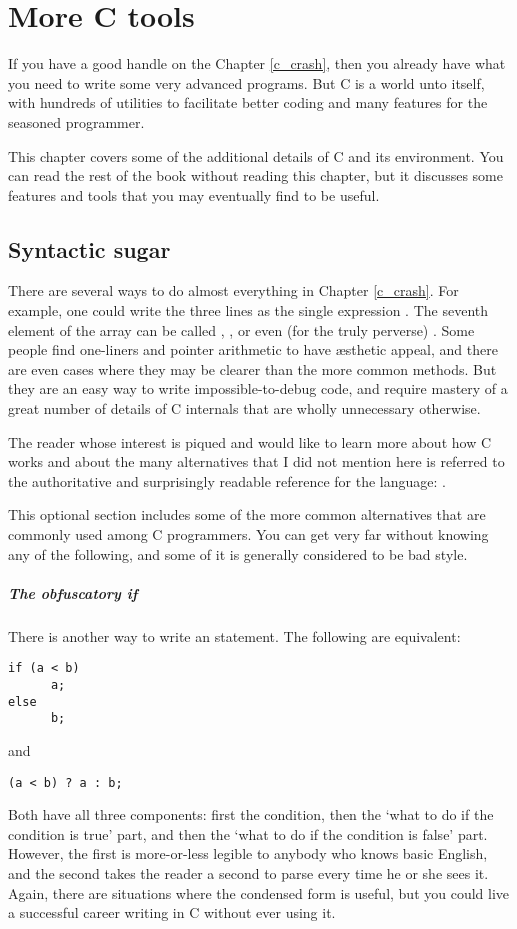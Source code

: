 \chapter{\treesymbol More C tools}

If you have a good handle on the Chapter \ref{c_crash}, then you already
have what you need to write some very advanced programs. But C is a
world unto itself, with hundreds of utilities to facilitate better
coding and many features for the seasoned programmer.

This chapter covers some of the additional details of C and its
environment. You can read the rest of the book without reading this
chapter, but it discusses some features and tools that you may
eventually find to be useful.


\section{Syntactic sugar}   
There are several ways to do almost everything in Chapter \ref{c_crash}.  For
example, one could write the three lines  as the single expression . The seventh
element of the array  can be called ,
, or even (for the truly perverse) .  Some people find one-liners and pointer arithmetic
to have \ae{}sthetic appeal, and there are even cases where they may
be clearer than the more common methods. But they are an easy way to
write impossible-to-debug code, and require mastery of a great number
of details of C internals that are wholly unnecessary otherwise.

The reader whose interest is piqued and would like to learn more about
how C works and about the many alternatives that I did not mention here
is referred to the authoritative and surprisingly readable reference
for the language: \cite{kandr:c}.

This optional section includes some of the more common alternatives that
are commonly used among C programmers. You can get very far without
knowing any of the following, and some of it is generally considered to
be bad style.

\paragraph{The obfuscatory if} There is another way to write an  statement. The following are equivalent:
\begin{lstlisting}
if (a < b)
      a;
else
      b;
\end{lstlisting}
and
\begin{lstlisting}
(a < b) ? a : b;
\end{lstlisting}
Both have all three components: first the condition, then the `what to do if the
condition is true' part, and then the `what to do if the condition is false'
part. However, the first is more-or-less legible to anybody who knows basic English,
and the second takes the reader a second to parse every time he or she
sees it. Again, there are situations where the condensed form is useful,
but you could live a successful career writing in C without ever using it.


